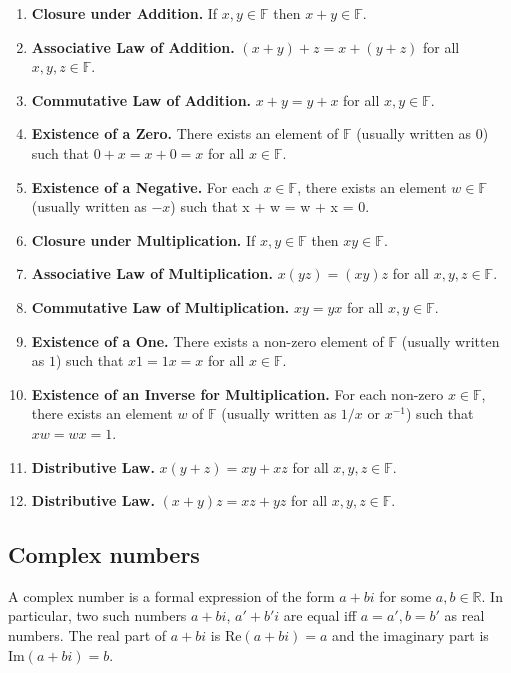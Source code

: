 \documentclass{report}
\begin{document}
		\begin{enumerate}
			\item \textbf{Closure under Addition.} If $x, y \in \mathbb{F}$ then $x + y \in \mathbb{F}$.
			\item \textbf{Associative Law of Addition.} $(x + y) + z = x + (y + z)$ for all $x, y, z \in \mathbb{F}$.
			\item \textbf{Commutative Law of Addition.} $x + y = y + x$ for all $x, y \in \mathbb{F}$.
			\item \textbf{Existence of a Zero.} There exists an element of $\mathbb{F}$ (usually written as $0$) such that $0 + x = x + 0 = x$ for all $x \in \mathbb{F}$.
			\item \textbf{Existence of a Negative.} For each $x \in \mathbb{F}$, there exists an element $w \in \mathbb{F}$ (usually written as $-x$) such that x + w = w + x = 0.
			\item \textbf{Closure under Multiplication.} If $x, y \in \mathbb{F}$ then $xy \in \mathbb{F}$.
			\item \textbf{Associative Law of Multiplication.} $x(yz) = (xy)z$ for all $x, y, z \in \mathbb{F}$.
			\item \textbf{Commutative Law of Multiplication.} $xy = yx$ for all $x, y \in \mathbb{F}$.
			\item \textbf{Existence of a One.} There exists a non-zero element of $\mathbb{F}$ (usually written as $1$) such that $x1 = 1x = x$ for all $x \in \mathbb{F}$.
			\item \textbf{Existence of an Inverse for Multiplication.} For each non-zero $x \in \mathbb{F}$, there exists an element $w$ of $\mathbb{F}$ (usually written as $1/x$ or $x^{-1}$) such that $xw = wx = 1$.
			\item \textbf{Distributive Law.} $x(y + z) = xy + xz$ for all $x, y, z \in \mathbb{F}$.
			\item \textbf{Distributive Law.} $(x + y)z = xz + yz$ for all $x, y, z \in \mathbb{F}$.
		\end{enumerate}

	\subsection{Complex numbers}
		
	A complex number is a formal expression of the form $a + bi$ for some $a,b \in \mathbb{R}$. In particular, two such numbers $a+bi$, $a'+b' i$ are equal iff $a = a', b = b'$ as real numbers. The real part of $a+bi$ is $\text{Re}(a+bi) = a$ and the imaginary part is $\text{Im}(a+bi) = b$.
\end{document}
